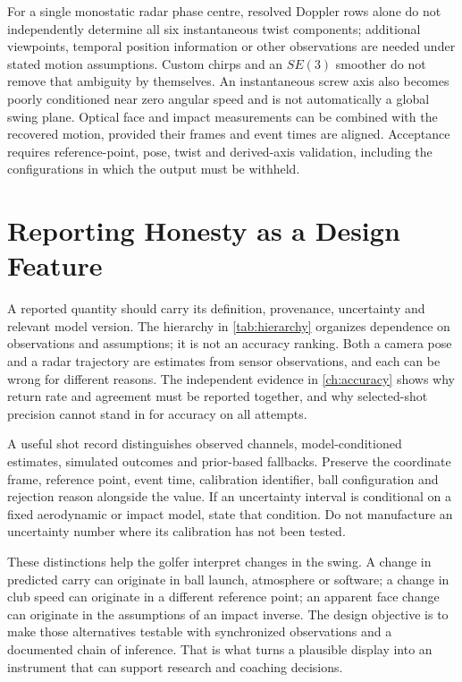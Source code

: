 \begin{enumerate}
For a single monostatic radar phase centre, resolved Doppler rows alone do not independently determine all six instantaneous twist components; additional viewpoints, temporal position information or other observations are needed under stated motion assumptions.
Custom chirps and an $SE(3)$ smoother do not remove that ambiguity by themselves.
An instantaneous screw axis also becomes poorly conditioned near zero angular speed and is not automatically a global swing plane.
Optical face and impact measurements can be combined with the recovered motion, provided their frames and event times are aligned.
Acceptance requires reference-point, pose, twist and derived-axis validation, including the configurations in which the output must be withheld.
\end{enumerate}

\section{Reporting Honesty as a Design Feature}

A reported quantity should carry its definition, provenance, uncertainty and relevant model version.
The hierarchy in \cref{tab:hierarchy} organizes dependence on observations and assumptions; it is not an accuracy ranking.
Both a camera pose and a radar trajectory are estimates from sensor observations, and each can be wrong for different reasons.
The independent evidence in \cref{ch:accuracy} shows why return rate and agreement must be reported together, and why selected-shot precision cannot stand in for accuracy on all attempts.

A useful shot record distinguishes observed channels, model-conditioned estimates, simulated outcomes and prior-based fallbacks.
Preserve the coordinate frame, reference point, event time, calibration identifier, ball configuration and rejection reason alongside the value.
If an uncertainty interval is conditional on a fixed aerodynamic or impact model, state that condition.
Do not manufacture an uncertainty number where its calibration has not been tested.

These distinctions help the golfer interpret changes in the swing.
A change in predicted carry can originate in ball launch, atmosphere or software; a change in club speed can originate in a different reference point; an apparent face change can originate in the assumptions of an impact inverse.
The design objective is to make those alternatives testable with synchronized observations and a documented chain of inference.
That is what turns a plausible display into an instrument that can support research and coaching decisions.
